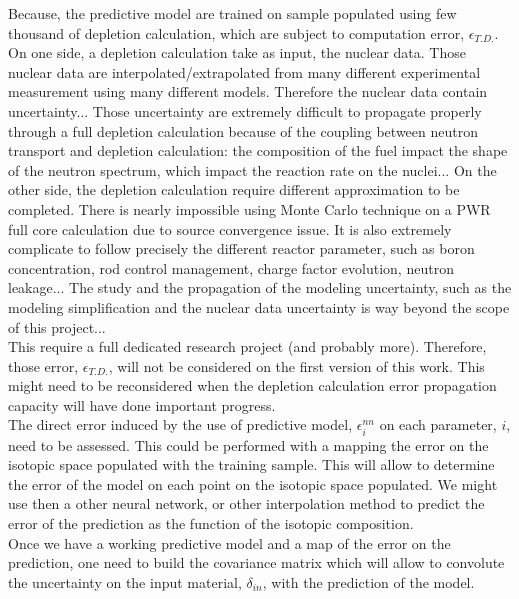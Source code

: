\documentclass[dvips,12pt]{article}
\begin{document}
Because, the predictive model are trained on sample populated using few thousand of depletion calculation, which are subject to computation error, $\epsilon_{T.D.}$. On one side, a depletion calculation take as input, the nuclear data. Those nuclear data are interpolated/extrapolated from many different experimental measurement using many different models. Therefore the nuclear data contain uncertainty...
Those uncertainty are extremely difficult to propagate properly through a full depletion calculation because of the coupling between neutron transport and depletion calculation: the composition of the fuel impact the shape of the neutron spectrum, which impact the reaction rate on the nuclei... On the other side, the depletion calculation require different approximation to be completed. There is nearly impossible using Monte Carlo technique on a PWR full core calculation due to source convergence issue. It is also extremely complicate to follow precisely the different reactor parameter, such as boron concentration, rod control management, charge factor evolution, neutron leakage... The study and the propagation of the modeling uncertainty, such as the modeling simplification and the nuclear data uncertainty is way beyond the scope of this project...\\
 This require a full dedicated research project (and probably more). Therefore, those error, $\epsilon_{T.D.}$, will not be considered on the first version of this work. This might need to be reconsidered when the depletion calculation error propagation capacity will have done important progress.\\

The direct error induced by the use of predictive model, $\epsilon^{nn}_{i}$ on each parameter, $i$, need to be assessed. This could be performed with a mapping the error on the isotopic space populated with the training sample. This will allow to determine the error of the model on each point on the isotopic space populated. We might use then a other neural network, or other interpolation method to predict the error of the prediction as the function of the isotopic composition.\\
Once we have a working predictive model and a map of the error on the prediction, one need to build the covariance matrix which will allow to convolute the uncertainty on the input material, $\delta _{in}$, with the prediction of the model.\\
\end{document}
